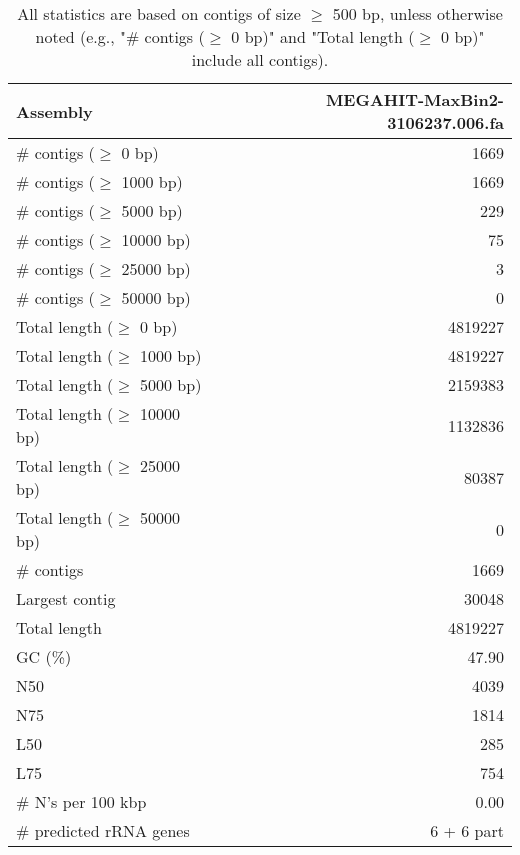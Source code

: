 \documentclass[12pt,a4paper]{article}
\begin{document}
\begin{table}[ht]
\begin{center}
\caption{All statistics are based on contigs of size $\geq$ 500 bp, unless otherwise noted (e.g., "\# contigs ($\geq$ 0 bp)" and "Total length ($\geq$ 0 bp)" include all contigs).}
\begin{tabular}{|l*{1}{|r}|}
\hline
Assembly & MEGAHIT-MaxBin2-3106237.006.fa \\ \hline
\# contigs ($\geq$ 0 bp) & 1669 \\ \hline
\# contigs ($\geq$ 1000 bp) & 1669 \\ \hline
\# contigs ($\geq$ 5000 bp) & 229 \\ \hline
\# contigs ($\geq$ 10000 bp) & 75 \\ \hline
\# contigs ($\geq$ 25000 bp) & 3 \\ \hline
\# contigs ($\geq$ 50000 bp) & 0 \\ \hline
Total length ($\geq$ 0 bp) & 4819227 \\ \hline
Total length ($\geq$ 1000 bp) & 4819227 \\ \hline
Total length ($\geq$ 5000 bp) & 2159383 \\ \hline
Total length ($\geq$ 10000 bp) & 1132836 \\ \hline
Total length ($\geq$ 25000 bp) & 80387 \\ \hline
Total length ($\geq$ 50000 bp) & 0 \\ \hline
\# contigs & 1669 \\ \hline
Largest contig & 30048 \\ \hline
Total length & 4819227 \\ \hline
GC (\%) & 47.90 \\ \hline
N50 & 4039 \\ \hline
N75 & 1814 \\ \hline
L50 & 285 \\ \hline
L75 & 754 \\ \hline
\# N's per 100 kbp & 0.00 \\ \hline
\# predicted rRNA genes & 6 + 6 part \\ \hline
\end{tabular}
\end{center}
\end{table}
\end{document}
